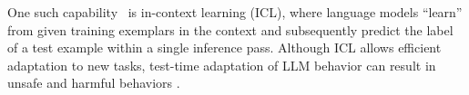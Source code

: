 


\iffalse
{}

 
One such capability~\citep{wei2022emergent} is in-context learning (ICL), where language models ``learn'' from given training exemplars in the context and subsequently predict the label of a test example within a single inference pass. 
Although ICL allows efficient adaptation to new tasks, test-time adaptation of LLM behavior can result in unsafe and harmful behaviors .
 
